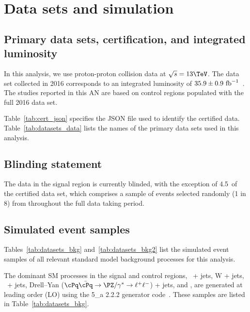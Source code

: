 \section{Data sets and simulation}
\label{sec:datasets}

\subsection{Primary data sets, certification, and integrated luminosity}

In this analysis, we use proton-proton collision data at $\sqrt{s} =
13\TeV$. The data set collected in 2016 corresponds to an integrated
luminosity of $35.9 \pm 0.9~\text{fb}^{-1}$~\cite{lumi}. The studies reported in
this AN are based on control regions populated with the full 2016 data
set.

Table~\ref{tab:cert_json} specifies the JSON file used to identify the
certified data.  Table~\ref{tab:datasets_data} lists the names of the
primary data sets used in this analysis.

\begin{table}[h!]
  \footnotesize
   
  \label{tab:cert_json}
\end{table}

\subsection{Blinding statement}

The data in the signal region is currently blinded, with the exception
of 4.5~\ifb of the certified data set, which comprises a sample of
events selected randomly (1 in 8) from throughout the full data taking
period. 

\subsection{Simulated event samples}

Tables~\ref{tab:datasets_bkg} and~\ref{tab:datasets_bkg2} list the
simulated event samples of all relevant standard model background
processes for this analysis.

The dominant SM processes in the signal and control regions, \znunu\ +
jets, W + jets, \ttbar\ + jets, Drell--Yan ($\cPq\bar{\cPq} \to
\PZ/\gamma^* \to \ell^+\ell^-$) + jets, and \gj, are generated at
leading order (LO) using the {\MADGRAPH{}5\_a\MCATNLO} 2.2.2 generator
code~\cite{Alwall2014}. These samples are listed in
Table~\ref{tab:datasets_bkg}.

